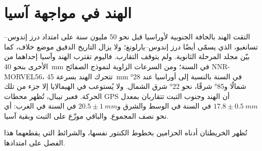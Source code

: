 \section{الهند في مواجهة آسيا}\label{sec:b2:himalaya-andes:himalaya}

التقت الهند بالحافة الجنوبية لأوراسيا قبل نحو 50 مليون سنة على امتداد درز إندوس--تسانغبو،
الذي يسمّى أيضًا درز إندوس--يارلونغ؛ ولا يزال التاريخ الدقيق موضع خلاف، كما بيّن
مجلد المرحلة الثانوية. ولم يتوقف التقارب. فاليوم تقترب الهند وآسيا إحداهما من الأخرى
بنحو \qty{40}{mm} في السنة؛ ومن السرعات الزاوية لنموذج الصفائح NNR-MORVEL56،
تتحرك الهند بسرعة \qty{45}{mm} في السنة بالنسبة إلى أوراسيا عند \ang{28} شمالًا و\ang{85} شرقًا، نحو
\ang{22} شرق الشمال. ولا يُستوعب في الهيمالايا إلا جزء من تلك الحركة. فعبر نيبال،
تُظهر محطات GPS أن الهند وجنوب التبت تتقاربان بمعدل $17.8 \pm \qty{0.5}{mm}$ في السنة في
الوسط والشرق و$20.5 \pm \qty{1}{mm}$ في السنة في الغرب: أي نحو نصف المجموع. والباقي
موزّع على التبت وبقية آسيا.

تُظهر الخريطتان أدناه الحزامين بخطوط الكنتور نفسها، والشرائط التي يقطعهما هذا
الفصل على امتدادها.

